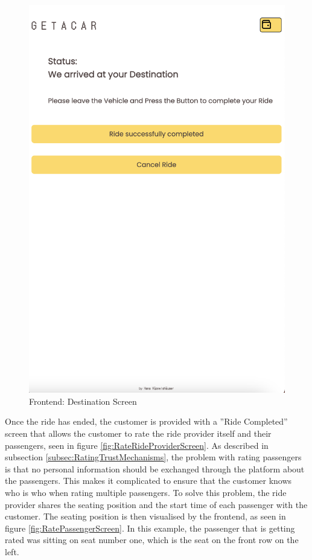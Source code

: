 \begin{figure}[H]
\begin{minipage}{0.45\linewidth}
        \includegraphics[width=\linewidth]{data/ffss/10.png}
        \caption{Frontend: Destination Screen}
        \label{fig:DestinationScreen}
    \end{minipage}
    
\end{figure}

Once the ride has ended, the customer is provided with a ''Ride Completed'' screen that allows the customer to rate the ride provider itself and their passengers, seen in figure \ref{fig:RateRideProviderScreen}. As described in subsection \ref{subsec:RatingTrustMechanisms}, the problem with rating passengers is that no personal information should be exchanged through the platform about the passengers. This makes it complicated to ensure that the customer knows who is who when rating multiple passengers. To solve this problem, the ride provider shares the seating position and the start time of each passenger with the customer. The seating position is then visualised by the frontend, as seen in figure \ref{fig:RatePassengerScreen}. In this example, the passenger that is getting rated was sitting on seat number one, which is the seat on the front row on the left. 



